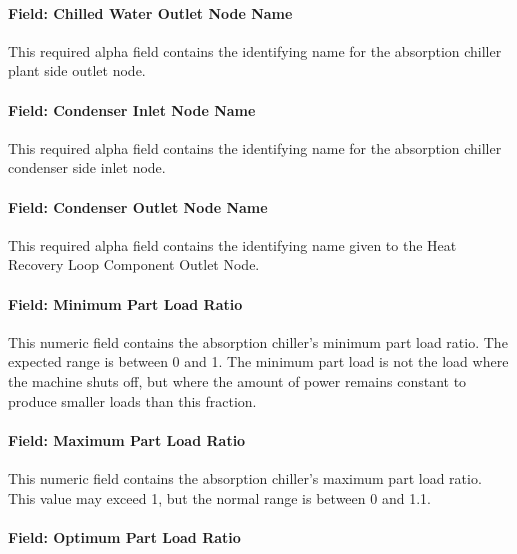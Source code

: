\paragraph{Field: Chilled Water Outlet Node Name}\label{field-chilled-water-outlet-node-name-000}

This required alpha field contains the identifying name for the absorption chiller plant side outlet node.

\paragraph{Field: Condenser Inlet Node Name}\label{field-condenser-inlet-node-name}

This required alpha field contains the identifying name for the absorption chiller condenser side inlet node.

\paragraph{Field: Condenser Outlet Node Name}\label{field-condenser-outlet-node-name}

This required alpha field contains the identifying name given to the Heat Recovery Loop Component Outlet Node.

\paragraph{Field: Minimum Part Load Ratio}\label{field-minimum-part-load-ratio-001}

This numeric field contains the absorption chiller's minimum part load ratio. The expected range is between 0 and 1. The minimum part load is not the load where the machine shuts off, but where the amount of power remains constant to produce smaller loads than this fraction.

\paragraph{Field: Maximum Part Load Ratio}\label{field-maximum-part-load-ratio-001}

This numeric field contains the absorption chiller's maximum part load ratio. This value may exceed 1, but the normal range is between 0 and 1.1.

\paragraph{Field: Optimum Part Load Ratio}\label{field-optimum-part-load-ratio-001}

